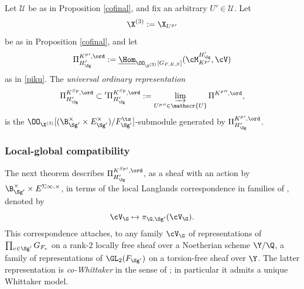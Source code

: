 \begin{defi}
\notready
Let $\mathscr{U}$ be as in Proposition \ref{cofinal}, and fix an arbitrary
$ U' \in \mathscr{U}$. Let
$$\X^{(3)}:=\X_{U^{p}{}'}$$
be as in Proposition \ref{cofinal}, and
let
$$\Pi^{K^{p}{}', \ord}_{{H_{\Sg}'}}:=\underline{\Hom}_{\OO_{\X^{(3)}}[G_{F, E, S}]}(\cM_{K^{p}{}'}^{{H_{\Sg}'}},\cV) $$ as in \eqref{piku}.
The \emph{universal ordinary representation}
 $$\Pi^{K^{Sp}, \ord}_{{{H_{\Sg}'}}}\subset
 {}' \Pi^{K^{Sp}, \ord}_{{H_{\Sg}'}}:=\varinjlim_{U^{p}{}''\in \mathscr{U}} \Pi^{K^{p}{}'', \ord},$$
 is the $\OO_{\X^{(3)}}[(\B_{{\Sg'}}^{\times}\times E_{{\Sg'}}^{\times})/F_{{\Sg'}}^{\ts}]$-submodule
  generated by $\Pi_{{H_{\Sg}'}}^{K^{p}{}', \ord}$.
  \end{defi}








\subsubsection{Local-global compatibility}
The next theorem describes $\Pi^{K^{{S}p}{}', \ord}_{{{H_{\Sg}'}}}$, as a sheaf with an action by $\B_{{\Sg'}}^{\times}\times E^{\Sigma\infty,\times}$,  in terms of the local Langlands correspondence in  families of \cite{LLC}, denoted  by
$$\cV_{\G}\mapsto \pi_{\G, {\Sg'}}(\cV_{\G}) .$$
This correspondence attaches, to any  family $\cV_{\G}$ of representations of $\prod_{v\in {\Sg'} } G_{F_{v}}$ on  a rank-$2$ locally free sheaf over a Noetherian  scheme   $\Y/\Q$, a   family of representations of $\GL_{2}(F_{{\Sg'}})$ on a torsion-free sheaf over $\Y$.  The latter  representation is \emph{co-Whittaker} in the sense of \cite[Definition 4.2.2]{LLC}; in particular it admits a unique Whittaker model.



